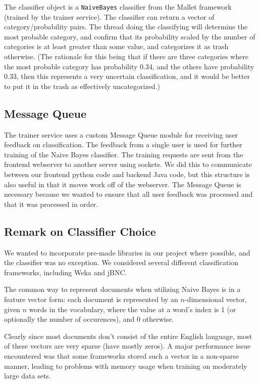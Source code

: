 \documentclass[letterpaper]{article}
\begin{document}
The classifier object is a \texttt{NaiveBayes} classifier from the Mallet framework (trained by the trainer service). The classifier can return a vector of category/probability pairs. The thread doing the classifying will determine the most probable category, and confirm that its probability scaled by the number of categories is at least greater than some value, and categorizes it as trash otherwise. (The rationale for this being that if there are three categories where the most probable category has probability 0.34, and the others have probability 0.33, then this represents a very uncertain classification, and it would be better to put it in the trash as effectively uncategorized.)

\subsection{Message Queue}
\label{MessageQueueSection}
The trainer service uses a custom Message Queue module for receiving user feedback on classification. The feedback from a single user is used for further training of the Naive Bayes classifier. The training requests are sent from the frontend webserver to another server using sockets. We did this to communicate between our frontend python code and backend Java code, but this structure is also useful in that it moves work off of the webserver. The Message Queue is necessary because we wanted to ensure that all user feedback was processed and that it was processed in order.

\subsection{Remark on Classifier Choice}
We wanted to incorporate pre-made libraries in our project where possible, and the classifier was no exception. We considered several different classification frameworks, including Weka and jBNC.

The common way to represent documents when utilizing Naive Bayes is in a feature vector form: each document is represented by an $n$-dimensional vector, given $n$ words in the vocabulary, where the value at a word's index is 1 (or optionally the number of occurences), and 0 otherwise.

Clearly since most documents don't consist of the entire English language, most of these vectors are very sparse (have mostly zeros).
A major performance issue encountered was that some frameworks stored such a vector in a non-sparse manner, leading to problems with memory usage when training on moderately large data sets.
\end{document}
